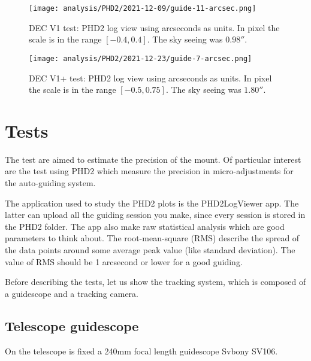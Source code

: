 \begin{figure*}[t]
    \centering
    \texttt{[image: analysis/PHD2/2021-12-09/guide-11-arcsec.png]}
    \caption{DEC V1 test: PHD2 log view using arcseconds as units. In pixel the scale is in the range \([-0.4,0.4]\). The sky seeing was \(0.98''\).}
    \label{fig:guide-11-arcsec}
\end{figure*}
\begin{figure*}[t]
    \centering
    \texttt{[image: analysis/PHD2/2021-12-23/guide-7-arcsec.png]}
    \caption{DEC V1+ test: PHD2 log view using arcseconds as units. In pixel the scale is in the range \([-0.5, 0.75]\). The sky seeing was \(1.80''\).}
    \label{fig:guide-7-arcseconds}
\end{figure*}

\section{Tests}
\label{sec:tests}


The test are aimed to estimate the precision of the mount.
Of particular interest are the test using PHD2 which measure the precision in micro-adjustments for the auto-guiding system.

The application used to study the PHD2 plots is the PHD2LogViewer app.
The latter can upload all the guiding session you make, since every session is stored in the PHD2 folder.
The app also make raw statistical analysis which are good parameters to think about.
The root-mean-square (RMS) describe the spread of the data points around some average peak value (like standard deviation).
The value of RMS should be 1 arcsecond or lower for a good guiding.

Before describing the tests, let us show the tracking system, which is composed of a guidescope and a tracking camera.

\subsection{Telescope guidescope}
On the telescope is fixed a 240mm focal length guidescope Svbony SV106.

